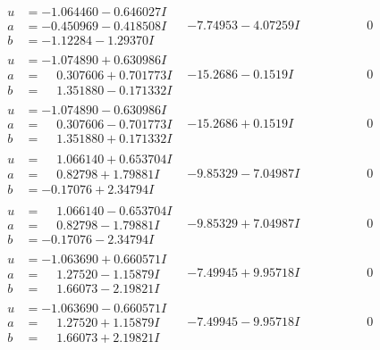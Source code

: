 \documentclass[1p]{elsarticle_modified}
\theoremstyle{definition}
\begin{document}
$$\begin{array}{c|c|c}
\begin{aligned}
u &= -1.064460 - 0.646027 I \\
a &= -0.450969 - 0.418508 I \\
b &= -1.12284 - 1.29370 I\end{aligned}
 & -7.74953 - 4.07259 I & \phantom{-0.000000 } 0 \\ \hline\begin{aligned}
u &= -1.074890 + 0.630986 I \\
a &= \phantom{-}0.307606 + 0.701773 I \\
b &= \phantom{-}1.351880 - 0.171332 I\end{aligned}
 & -15.2686 - 0.1519 I & \phantom{-0.000000 } 0 \\ \hline\begin{aligned}
u &= -1.074890 - 0.630986 I \\
a &= \phantom{-}0.307606 - 0.701773 I \\
b &= \phantom{-}1.351880 + 0.171332 I\end{aligned}
 & -15.2686 + 0.1519 I & \phantom{-0.000000 } 0 \\ \hline\begin{aligned}
u &= \phantom{-}1.066140 + 0.653704 I \\
a &= \phantom{-}0.82798 + 1.79881 I \\
b &= -0.17076 + 2.34794 I\end{aligned}
 & -9.85329 - 7.04987 I & \phantom{-0.000000 } 0 \\ \hline\begin{aligned}
u &= \phantom{-}1.066140 - 0.653704 I \\
a &= \phantom{-}0.82798 - 1.79881 I \\
b &= -0.17076 - 2.34794 I\end{aligned}
 & -9.85329 + 7.04987 I & \phantom{-0.000000 } 0 \\ \hline\begin{aligned}
u &= -1.063690 + 0.660571 I \\
a &= \phantom{-}1.27520 - 1.15879 I \\
b &= \phantom{-}1.66073 - 2.19821 I\end{aligned}
 & -7.49945 + 9.95718 I & \phantom{-0.000000 } 0 \\ \hline\begin{aligned}
u &= -1.063690 - 0.660571 I \\
a &= \phantom{-}1.27520 + 1.15879 I \\
b &= \phantom{-}1.66073 + 2.19821 I\end{aligned}
 & -7.49945 - 9.95718 I & \phantom{-0.000000 } 0 \\ \hline\begin{aligned}

\end{aligned}
\end{array}$$
\end{document}
